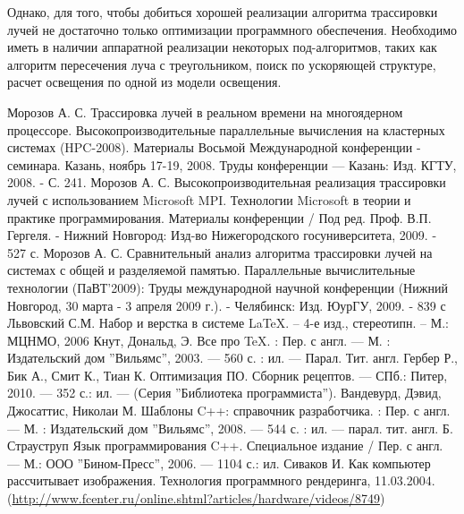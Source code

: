 \documentclass[12pt, a4paper, utf8]{article}
\begin{document}
Однако, для того, чтобы добиться хорошей реализации алгоритма трассировки лучей не достаточно только оптимизации программного обеспечения. Необходимо иметь в наличии аппаратной реализации некоторых под-алгоритмов, таких как алгоритм пересечения луча с треугольником, поиск по ускоряющей структуре, расчет освещения по одной из модели освещения.


\newpage
\begin{thebibliography}{99}
	 Морозов А. С. Трассировка лучей в реальном времени на многоядерном процессоре. Высокопроизводительные параллельные вычисления на кластерных системах (HPC-2008). Материалы Восьмой Международной конференции -  семинара. Казань, ноябрь 17-19, 2008. Труды конференции — Казань: Изд. КГТУ, 2008. - С. 241.
	 Морозов А. С. Высокопроизводительная реализация трассировки лучей с использованием Microsoft MPI. Технологии Microsoft в теории и практике программирования. Материалы конференции / Под ред. Проф. В.П. Гергеля. - Нижний Новгород: Изд-во Нижегородского госуниверситета, 2009. - 527 с.
	 Морозов А. С. Сравнительный анализ алгоритма трассировки лучей на системах с общей и разделяемой памятью. Параллельные вычислительные технологии (ПаВТ’2009): Труды международной научной конференции (Нижний Новгород, 30 марта - 3 апреля 2009 г.). - Челябинск: Изд. ЮурГУ, 2009. - 839 с
	 Львовский С.М. Набор и верстка в системе \LaTeX. – 4-е изд., стереотипн. – М.: МЦНМО, 2006
	 Кнут, Дональд, Э. Все про \TeX. : Пер. с англ. --- М. : Издательский дом ''Вильямс'', 2003. --- 560 с. : ил. --- Парал. Тит. англ.
	 Гербер Р., Бик А., Смит К., Тиан К. Оптимизация ПО. Сборник рецептов. --- СПб.: Питер, 2010. --- 352 с.: ил. --- (Серия ''Библиотека программиста'').
	 Вандевурд, Дэвид, Джосаттис, Николаи М. Шаблоны C++: справочник разработчика. : Пер. с англ. --- М. : Издательский дом ''Вильямс'', 2008. --- 544 с. : ил. --- парал. тит. англ.
	 Б. Страуструп Язык программирования C++. Специальное издание / Пер. с англ. --- М.: ООО ''Бином-Пресс'', 2006. --- 1104 с.: ил.
	 Сиваков И. Как компьютер рассчитывает изображения. Технология программного рендеринга, 11.03.2004. \\ (\href{http://www.fcenter.ru/online.shtml?articles/hardware/videos/8749}{http://www.fcenter.ru/online.shtml?articles/hardware/videos/8749})

\end{thebibliography}
\end{document}
